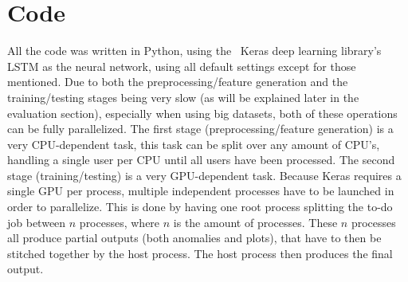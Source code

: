 \section{Code}
All the code was written in Python, using the~\cite{chollet2015keras} Keras deep learning library's LSTM as the neural network, using all default settings except for those mentioned. Due to both the preprocessing/feature generation and the training/testing stages being very slow (as will be explained later in the evaluation section), especially when using big datasets, both of these operations can be fully parallelized. The first stage (preprocessing/feature generation) is a very CPU-dependent task, this task can be split over any amount of CPU's, handling a single user per CPU until all users have been processed. The second stage (training/testing) is a very GPU-dependent task. Because Keras requires a single GPU per process, multiple independent processes have to be launched in order to parallelize. This is done by having one root process splitting the to-do job between \(n\) processes, where \(n\) is the amount of processes. These \(n\) processes all produce partial outputs (both anomalies and plots), that have to then be stitched together by the host process. The host process then produces the final output.